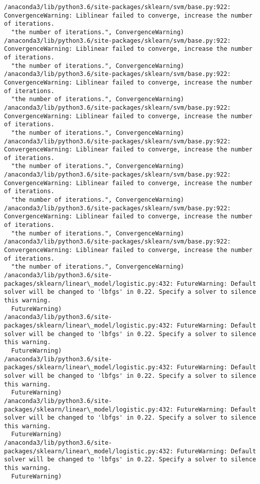 \documentclass[11pt]{article}
\begin{document}
\begin{Verbatim}[commandchars=\\\{\}]
/anaconda3/lib/python3.6/site-packages/sklearn/svm/base.py:922: ConvergenceWarning: Liblinear failed to converge, increase the number of iterations.
  "the number of iterations.", ConvergenceWarning)
/anaconda3/lib/python3.6/site-packages/sklearn/svm/base.py:922: ConvergenceWarning: Liblinear failed to converge, increase the number of iterations.
  "the number of iterations.", ConvergenceWarning)
/anaconda3/lib/python3.6/site-packages/sklearn/svm/base.py:922: ConvergenceWarning: Liblinear failed to converge, increase the number of iterations.
  "the number of iterations.", ConvergenceWarning)
/anaconda3/lib/python3.6/site-packages/sklearn/svm/base.py:922: ConvergenceWarning: Liblinear failed to converge, increase the number of iterations.
  "the number of iterations.", ConvergenceWarning)
/anaconda3/lib/python3.6/site-packages/sklearn/svm/base.py:922: ConvergenceWarning: Liblinear failed to converge, increase the number of iterations.
  "the number of iterations.", ConvergenceWarning)
/anaconda3/lib/python3.6/site-packages/sklearn/svm/base.py:922: ConvergenceWarning: Liblinear failed to converge, increase the number of iterations.
  "the number of iterations.", ConvergenceWarning)
/anaconda3/lib/python3.6/site-packages/sklearn/svm/base.py:922: ConvergenceWarning: Liblinear failed to converge, increase the number of iterations.
  "the number of iterations.", ConvergenceWarning)
/anaconda3/lib/python3.6/site-packages/sklearn/svm/base.py:922: ConvergenceWarning: Liblinear failed to converge, increase the number of iterations.
  "the number of iterations.", ConvergenceWarning)
/anaconda3/lib/python3.6/site-packages/sklearn/linear\_model/logistic.py:432: FutureWarning: Default solver will be changed to 'lbfgs' in 0.22. Specify a solver to silence this warning.
  FutureWarning)
/anaconda3/lib/python3.6/site-packages/sklearn/linear\_model/logistic.py:432: FutureWarning: Default solver will be changed to 'lbfgs' in 0.22. Specify a solver to silence this warning.
  FutureWarning)
/anaconda3/lib/python3.6/site-packages/sklearn/linear\_model/logistic.py:432: FutureWarning: Default solver will be changed to 'lbfgs' in 0.22. Specify a solver to silence this warning.
  FutureWarning)
/anaconda3/lib/python3.6/site-packages/sklearn/linear\_model/logistic.py:432: FutureWarning: Default solver will be changed to 'lbfgs' in 0.22. Specify a solver to silence this warning.
  FutureWarning)
/anaconda3/lib/python3.6/site-packages/sklearn/linear\_model/logistic.py:432: FutureWarning: Default solver will be changed to 'lbfgs' in 0.22. Specify a solver to silence this warning.
  FutureWarning)

\end{Verbatim}
\end{document}
